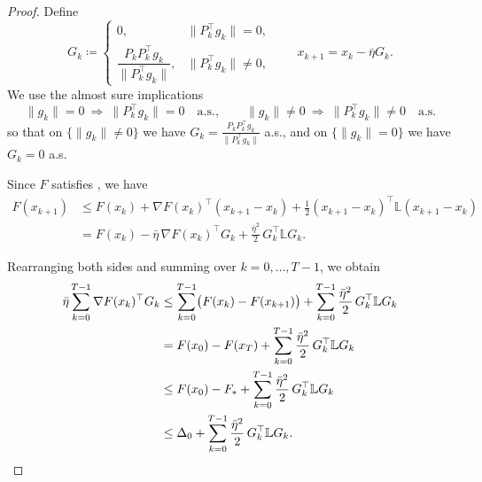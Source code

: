 \documentclass[10pt]{article}
\begin{document}
\begin{proof}
Define
\[
G_k \coloneqq
\begin{cases}
0, & \|P_k^\top g_k\|=0,\\[2mm]
\dfrac{P_kP_k^\top g_k}{\|P_k^\top g_k\|}, & \|P_k^\top g_k\|\neq 0,
\end{cases}
\qquad
x_{k+1}=x_k-\bar{\eta}G_k .
\]
We use the almost sure implications
\[
\|g_k\|=0 \ \Rightarrow\ \|P_k^\top g_k\|=0 \quad \text{a.s.},
\qquad
\|g_k\|\neq 0 \ \Rightarrow\ \|P_k^\top g_k\|\neq 0 \quad \text{a.s.}
\]
so that on $\{\|g_k\|\neq 0\}$ we have $G_k=\frac{P_kP_k^\top g_k}{\|P_k^\top g_k\|}$ a.s.,
and on $\{\|g_k\|=0\}$ we have $G_k=0$ a.s.

Since $F$ satisfies , we have
\begin{align*}
F(x_{k+1})
&\le
F(x_k)
+ \nabla F(x_k)^\top (x_{k+1}-x_k)
+ \frac{1}{2}(x_{k+1}-x_k)^\top \mathbb{L}(x_{k+1}-x_k) \\
&=
F(x_k)
- \bar{\eta}\,\nabla F(x_k)^\top G_k
+ \frac{\bar{\eta}^2}{2}\,G_k^\top \mathbb{L} G_k .
\end{align*}

Rearranging both sides and summing over $k=0,\dots,T-1$, we obtain
\begin{align}
\bar{\eta}
\sum_{k=0}^{T-1}
\nabla F(x_k)^\top G_k
&\le
\sum_{k=0}^{T-1}\bigl(F(x_k)-F(x_{k+1})\bigr)
+ \sum_{k=0}^{T-1}
\frac{\bar{\eta}^2}{2}\,G_k^\top \mathbb{L} G_k
\notag\\
&=
F(x_0)-F(x_T)
+ \sum_{k=0}^{T-1}
\frac{\bar{\eta}^2}{2}\,G_k^\top \mathbb{L} G_k
\notag\\
&\le
F(x_0)-F_*
+ \sum_{k=0}^{T-1}
\frac{\bar{\eta}^2}{2}\,G_k^\top \mathbb{L} G_k
\notag\\
&\le
\Delta_0
+ \sum_{k=0}^{T-1}
\frac{\bar{\eta}^2}{2}\,G_k^\top \mathbb{L} G_k .
\label{eq:main_sum}
\end{align}


\end{proof}
\end{document}
